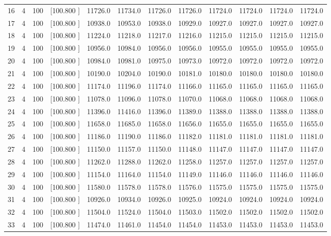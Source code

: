 \documentclass[12pt,a4paper]{article}
\begin{document}
\begin{center}
{\begin{tabular}{r r r r r r r r r r r r}
  16&  4&100&[100.800   ]& 11726.0& 11734.0& 11726.0& 11726.0& 11724.0& 11724.0& 11724.0& 11724.0\\[-0.02in]
  17&  4&100&[100.800   ]& 10938.0& 10953.0& 10938.0& 10929.0& 10927.0& 10927.0& 10927.0& 10927.0\\[-0.02in]
  18&  4&100&[100.800   ]& 11224.0& 11218.0& 11217.0& 11216.0& 11215.0& 11215.0& 11215.0& 11215.0\\[-0.02in]
  19&  4&100&[100.800   ]& 10956.0& 10984.0& 10956.0& 10956.0& 10955.0& 10955.0& 10955.0& 10955.0\\[-0.02in]
  20&  4&100&[100.800   ]& 10984.0& 10981.0& 10975.0& 10973.0& 10972.0& 10972.0& 10972.0& 10972.0\\[-0.02in]
  21&  4&100&[100.800   ]& 10190.0& 10204.0& 10190.0& 10181.0& 10180.0& 10180.0& 10180.0& 10180.0\\[-0.02in]
  22&  4&100&[100.800   ]& 11174.0& 11196.0& 11174.0& 11166.0& 11165.0& 11165.0& 11165.0& 11165.0\\[-0.02in]
  23&  4&100&[100.800   ]& 11078.0& 11096.0& 11078.0& 11070.0& 11068.0& 11068.0& 11068.0& 11068.0\\[-0.02in]
  24&  4&100&[100.800   ]& 11396.0& 11416.0& 11396.0& 11389.0& 11388.0& 11388.0& 11388.0& 11388.0\\[-0.02in]
  25&  4&100&[100.800   ]& 11658.0& 11685.0& 11658.0& 11656.0& 11655.0& 11655.0& 11655.0& 11655.0\\[-0.02in]
  26&  4&100&[100.800   ]& 11186.0& 11190.0& 11186.0& 11182.0& 11181.0& 11181.0& 11181.0& 11181.0\\[-0.02in]
  27&  4&100&[100.800   ]& 11150.0& 11157.0& 11150.0& 11148.0& 11147.0& 11147.0& 11147.0& 11147.0\\[-0.02in]
  28&  4&100&[100.800   ]& 11262.0& 11288.0& 11262.0& 11258.0& 11257.0& 11257.0& 11257.0& 11257.0\\[-0.02in]
  29&  4&100&[100.800   ]& 11154.0& 11164.0& 11154.0& 11149.0& 11146.0& 11146.0& 11146.0& 11146.0\\[-0.02in]
  30&  4&100&[100.800   ]& 11580.0& 11578.0& 11578.0& 11576.0& 11575.0& 11575.0& 11575.0& 11575.0\\[-0.02in]
  31&  4&100&[100.800   ]& 10926.0& 10934.0& 10926.0& 10925.0& 10924.0& 10924.0& 10924.0& 10924.0\\[-0.02in]
  32&  4&100&[100.800   ]& 11504.0& 11524.0& 11504.0& 11503.0& 11502.0& 11502.0& 11502.0& 11502.0\\[-0.02in]
  33&  4&100&[100.800   ]& 11474.0& 11461.0& 11454.0& 11454.0& 11453.0& 11453.0& 11453.0& 11453.0\\[-0.02in]

\end{tabular}}
\end{center}
\end{document}
